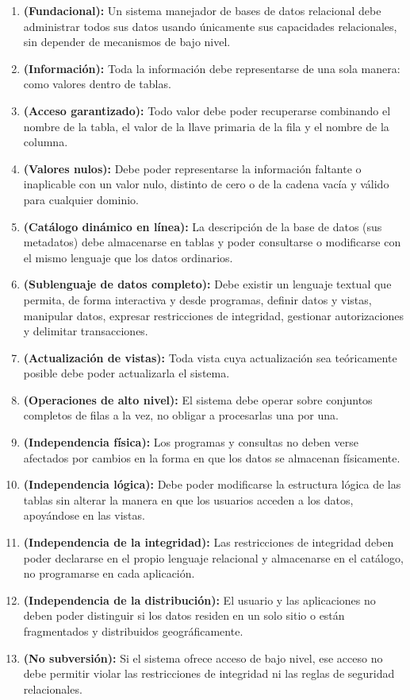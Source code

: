 \begin{enumerate}[i.]
	      \begin{enumerate}[start=0, label=\textbf{Regla \arabic*.}]
		      \item \textbf{(Fundacional):} Un sistema manejador de bases de datos relacional debe administrar todos sus datos usando únicamente sus capacidades relacionales, sin depender de mecanismos de bajo nivel.
		      \item \textbf{(Información):} Toda la información debe representarse de una sola manera: como valores dentro de tablas.
		      \item \textbf{(Acceso garantizado):} Todo valor debe poder recuperarse combinando el nombre de la tabla, el valor de la llave primaria de la fila y el nombre de la columna.
		      \item \textbf{(Valores nulos):} Debe poder representarse la información faltante o inaplicable con un valor nulo, distinto de cero o de la cadena vacía y válido para cualquier dominio.
		      \item \textbf{(Catálogo dinámico en línea):} La descripción de la base de datos (sus metadatos) debe almacenarse en tablas y poder consultarse o modificarse con el mismo lenguaje que los datos ordinarios.
		      \item \textbf{(Sublenguaje de datos completo):} Debe existir un lenguaje textual que permita, de forma interactiva y desde programas, definir datos y vistas, manipular datos, expresar restricciones de integridad, gestionar autorizaciones y delimitar transacciones.
		      \item \textbf{(Actualización de vistas):} Toda vista cuya actualización sea teóricamente posible debe poder actualizarla el sistema.
		      \item \textbf{(Operaciones de alto nivel):} El sistema debe operar sobre conjuntos completos de filas a la vez, no obligar a procesarlas una por una.
		      \item \textbf{(Independencia física):} Los programas y consultas no deben verse afectados por cambios en la forma en que los datos se almacenan físicamente.
		      \item \textbf{(Independencia lógica):} Debe poder modificarse la estructura lógica de las tablas sin alterar la manera en que los usuarios acceden a los datos, apoyándose en las vistas.
		      \item \textbf{(Independencia de la integridad):} Las restricciones de integridad deben poder declararse en el propio lenguaje relacional y almacenarse en el catálogo, no programarse en cada aplicación.
		      \item \textbf{(Independencia de la distribución):} El usuario y las aplicaciones no deben poder distinguir si los datos residen en un solo sitio o están fragmentados y distribuidos geográficamente.
		      \item \textbf{(No subversión):} Si el sistema ofrece acceso de bajo nivel, ese acceso no debe permitir violar las restricciones de integridad ni las reglas de seguridad relacionales.
	      \end{enumerate}


\end{enumerate}
